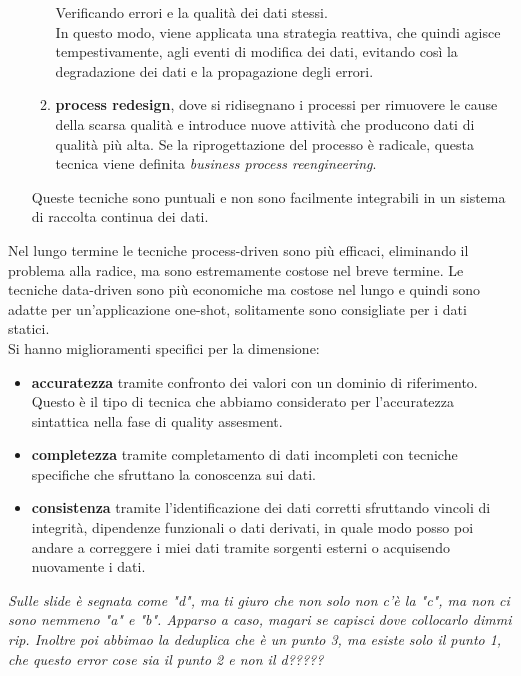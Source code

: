 \begin{enumerate}
\begin{enumerate}
        Verificando errori e la qualità dei dati stessi.\\
        In questo modo, viene applicata una strategia reattiva, che quindi agisce tempestivamente, agli eventi di modifica dei dati, evitando così la degradazione dei dati e la propagazione degli errori.
        \item \textbf{process redesign}, dove si ridisegnano i processi per rimuovere le cause della scarsa qualità e introduce nuove attività che producono dati di qualità più alta. Se la riprogettazione del processo è radicale, questa tecnica viene definita \textit{business process reengineering}.
        \end{enumerate}
    Queste tecniche sono puntuali e non sono facilmente integrabili in un sistema di raccolta continua dei dati.
\end{enumerate}

Nel lungo termine le tecniche process-driven sono più efficaci, eliminando il problema alla radice, ma sono estremamente costose nel breve termine. Le tecniche data-driven sono più economiche ma costose nel lungo e quindi sono adatte per un'applicazione one-shot, solitamente sono consigliate per i dati statici. \\

Si hanno miglioramenti specifici per la dimensione:
\begin{itemize}
    \item \textbf{accuratezza} tramite confronto dei valori con un dominio di riferimento. Questo è il tipo di tecnica che abbiamo considerato per l'accuratezza sintattica nella fase di quality assesment.
    \item \textbf{completezza} tramite completamento di dati incompleti con tecniche specifiche che sfruttano la conoscenza sui dati.
    \item \textbf{consistenza} tramite l'identificazione dei dati corretti sfruttando vincoli di integrità, dipendenze funzionali o dati derivati, in quale modo posso poi andare a correggere i miei dati tramite sorgenti esterni o acquisendo nuovamente i dati.
\end{itemize}

\textit{Sulle slide è segnata come "d", ma ti giuro che non solo non c'è la "c", ma non ci sono nemmeno "a" e "b". Apparso a caso, magari se capisci dove collocarlo dimmi rip. Inoltre poi abbimao la deduplica che è un punto 3, ma esiste solo il punto 1, che questo error cose sia il punto 2 e non il d?????}\\

